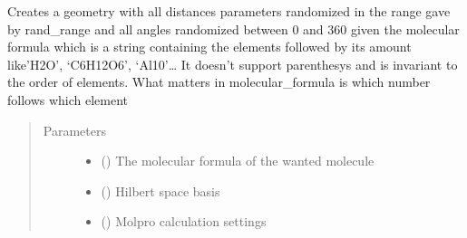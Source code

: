\documentclass[letterpaper,10pt,english]{sphinxmanual}
\begin{document}
\begin{fulllineitems}
\label{\detokenize{MolOpt.molecular:MolOpt.molecular.molecular.random_molecule}}
\sphinxAtStartPar
Creates a geometry with all distances parameters randomized in the range gave by rand\_range and all angles 
randomized between 0 and 360 given the molecular formula which is a string containing the elements followed by its 
amount like’H2O’, ‘C6H12O6’, ‘Al10’… It doesn’t support parenthesys and is invariant to the order of elements. 
What matters in molecular\_formula is which number follows which element
\begin{quote}\begin{description}
\item[{Parameters}] \leavevmode\begin{itemize}
\item {} 
\sphinxAtStartPar
{} () \textendash{} The molecular formula of the wanted molecule

\item {} 
\sphinxAtStartPar
{} () \textendash{} Hilbert space basis

\item {} 
\sphinxAtStartPar
{} (\sphinxstyleliteralemphasis{\sphinxupquote{{[}}}\sphinxstyleliteralemphasis{\sphinxupquote{{]}}}) \textendash{} Molpro calculation settings


\end{itemize}
\end{description}
\end{quote}
\end{fulllineitems}
\end{document}
